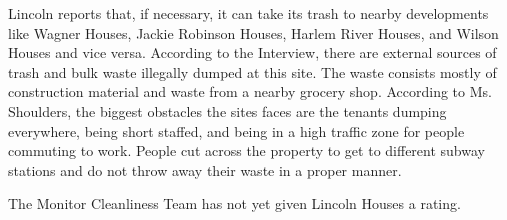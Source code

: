 Lincoln reports that, if necessary, it can take its trash to nearby developments like Wagner Houses, Jackie Robinson Houses, Harlem River Houses, and Wilson Houses and vice versa. According to the Interview, there are external sources of trash and bulk waste illegally dumped at this site. The waste consists mostly of construction material and waste from a nearby grocery shop. According to Ms. Shoulders, the biggest obstacles the sites faces are the tenants dumping everywhere, being short staffed, and being in a high traffic zone for people commuting to work. People cut across the property to get to different subway stations and do not throw away their waste in a proper manner. 

 

The Monitor Cleanliness Team has not yet given Lincoln Houses a rating.  

 